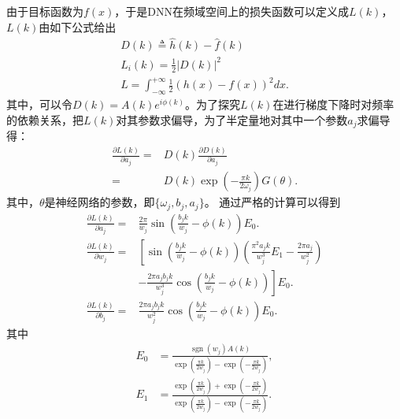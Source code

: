 由于目标函数为$f(x)$，于是DNN在频域空间上的损失函数可以定义成$L(k)$，$L(k)$由如下公式给出
\begin{equation}
\begin{array}{l}  
  D(k)\triangleq\hat{h}(k)-\hat{f}(k)  \\  
  L_i(k)=\frac{1}{2}\left|D(k)\right|^{2}  \\  
  L=\int_{-\infty}^{+\infty}\frac{1}{2}(h(x)-f(x))^{2}dx.
\end{array} 
\end{equation}
其中，可以令$D(k)=A(k)e^{i\phi (k)}$。为了探究$L(k)$在进行梯度下降时对频率的依赖关系，把$L(k)$对其参数求偏导，为了半定量地对其中一个参数$a_j$求偏导得：
\begin{equation}
    \begin{aligned}
\frac{\partial L(k)}{\partial a_{j}}= & D(k)\frac{\partial D(k)}{\partial a_j} \\
=& D(k)\exp(-\frac{\pi k}{2\omega_j})G(\theta).\label{cucao}
\end{aligned}
\end{equation}
其中，$\theta$是神经网络的参数，即$\{\omega_j,b_j,a_j\}$。
通过严格的计算可以得到
\begin{equation}
    \begin{aligned}
\frac{\partial L(k)}{\partial a_{j}}= & \frac{2 \pi}{w_{j}} \sin \left(\frac{b_{j} k}{w_{j}}-\phi(k)\right) E_{0}. \\
\frac{\partial L(k)}{\partial w_{j}}= & {\left[\sin \left(\frac{b_{j} k}{w_{j}}-\phi(k)\right)\left(\frac{\pi^{2} a_{j} k}{w_{j}^{3}} E_{1}-\frac{2 \pi a_{j}}{w_{j}^{2}}\right)\right.} \\
& \left.-\frac{2 \pi a_{j} b_{j} k}{w_{j}^{3}} \cos \left(\frac{b_{j} k}{w_{j}}-\phi(k)\right)\right] E_{0}. \\
\frac{\partial L(k)}{\partial b_{j}}= & \frac{2 \pi a_{j} b_{j} k}{w_{j}^{2}} \cos \left(\frac{b_{j} k}{w_{j}}-\phi(k)\right) E_{0}.
\end{aligned}
\end{equation}
其中
\begin{equation*}
    \begin{aligned}
E_{0} & =\frac{\operatorname{sgn}\left(w_{j}\right) A(k)}{\exp \left(\frac{\pi k}{2 w_{j}}\right)-\exp \left(-\frac{\pi k}{2 w_{j}}\right)}, \\
E_{1} & =\frac{\exp \left(\frac{\pi k}{2 w_{j}}\right)+\exp \left(-\frac{\pi k}{2 w_{j}}\right)}{\exp \left(\frac{\pi k}{2 w_{j}}\right)-\exp \left(-\frac{\pi k}{2 w_{j}}\right)} .
\end{aligned}
\end{equation*}

